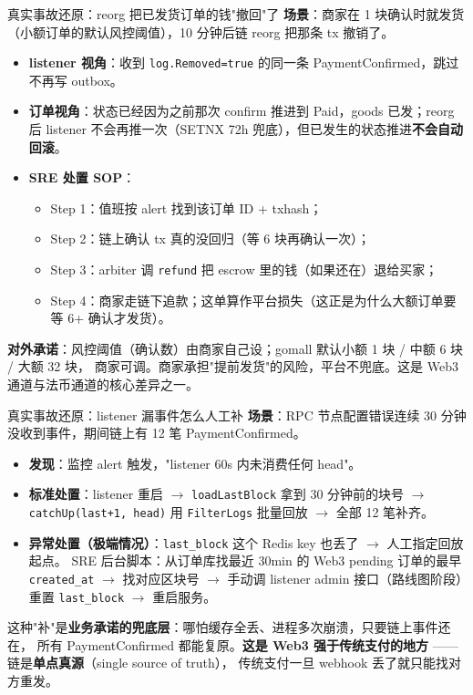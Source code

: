 \documentclass[aspectratio=169,11pt]{beamer}
\begin{document}
\begin{frame}[shrink]{真实事故还原：reorg 把已发货订单的钱"撤回"了}
\textbf{场景}：商家在 1 块确认时就发货（小额订单的默认风控阈值），10 分钟后链 reorg 把那条 tx 撤销了。
\vspace{1mm}
\begin{itemize}
  \item \textbf{listener 视角}：收到 \texttt{log.Removed=true} 的同一条 PaymentConfirmed，跳过不再写 outbox。
  \item \textbf{订单视角}：状态已经因为之前那次 confirm 推进到 Paid，goods 已发；reorg 后 listener 不会再推一次（SETNX 72h 兜底），但已发生的状态推进\textbf{不会自动回滚}。
  \item \textbf{SRE 处置 SOP}：
  \begin{itemize}
    \item Step 1：值班按 alert 找到该订单 ID + txhash；
    \item Step 2：链上确认 tx 真的没回归（等 6 块再确认一次）；
    \item Step 3：arbiter 调 \texttt{refund} 把 escrow 里的钱（如果还在）退给买家；
    \item Step 4：商家走链下追款；这单算作平台损失（这正是为什么大额订单要等 6+ 确认才发货）。
  \end{itemize}
\end{itemize}
\small \textbf{对外承诺}：风控阈值（确认数）由商家自己设；gomall 默认小额 1 块 / 中额 6 块 / 大额 32 块，
商家可调。商家承担"提前发货"的风险，平台不兜底。这是 Web3 通道与法币通道的核心差异之一。
\end{frame}

\begin{frame}[shrink]{真实事故还原：listener 漏事件怎么人工补}
\textbf{场景}：RPC 节点配置错误连续 30 分钟没收到事件，期间链上有 12 笔 PaymentConfirmed。
\vspace{1mm}
\begin{itemize}
  \item \textbf{发现}：监控 alert 触发，"listener 60s 内未消费任何 head"。
  \item \textbf{标准处置}：listener 重启 $\to$ \texttt{loadLastBlock} 拿到 30 分钟前的块号 $\to$
    \texttt{catchUp(last+1, head)} 用 \texttt{FilterLogs} 批量回放 $\to$ 全部 12 笔补齐。
  \item \textbf{异常处置（极端情况）}：\texttt{last\_block} 这个 Redis key 也丢了 $\to$ 人工指定回放起点。
    SRE 后台脚本：从订单库找最近 30min 的 Web3 pending 订单的最早 \texttt{created\_at} $\to$ 找对应区块号 $\to$
    手动调 listener admin 接口（路线图阶段）重置 \texttt{last\_block} $\to$ 重启服务。
\end{itemize}
\vspace{1mm}
\small 这种"补"是\textbf{业务承诺的兜底层}：哪怕缓存全丢、进程多次崩溃，只要链上事件还在，
所有 PaymentConfirmed 都能复原。\textbf{这是 Web3 强于传统支付的地方} —— 链是\textbf{单点真源}（single source of truth），
传统支付一旦 webhook 丢了就只能找对方重发。
\end{frame}
\end{document}
